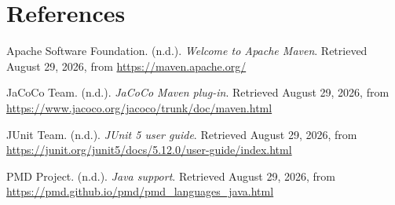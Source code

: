 \documentclass[12pt]{article}
\begin{document}
\section*{References}

\hangindent=0.5in Apache Software Foundation. (n.d.). \textit{Welcome to Apache Maven}. Retrieved August 29, 2026, from \url{https://maven.apache.org/}

\hangindent=0.5in JaCoCo Team. (n.d.). \textit{JaCoCo Maven plug-in}. Retrieved August 29, 2026, from \url{https://www.jacoco.org/jacoco/trunk/doc/maven.html}

\hangindent=0.5in JUnit Team. (n.d.). \textit{JUnit 5 user guide}. Retrieved August 29, 2026, from \url{https://junit.org/junit5/docs/5.12.0/user-guide/index.html}

\hangindent=0.5in PMD Project. (n.d.). \textit{Java support}. Retrieved August 29, 2026, from \url{https://pmd.github.io/pmd/pmd_languages_java.html}
\end{document}
